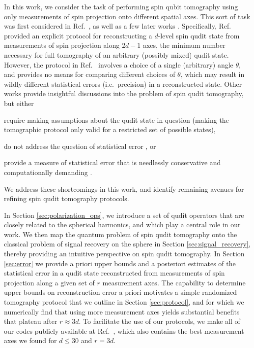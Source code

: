 \documentclass[nofootinbib,twocolumn]{revtex4-1}
\begin{document}
In this work, we consider the task of performing spin qubit tomography using only measurements of spin projection onto different spatial axes.
This sort of task was first considered in Ref.~\cite{newton1968measurability}, as well as a few later works \cite{hofmann2004quantumstate, filippov2010inverse, schmied2011tomographic}.
Specifically, Ref.~\cite{newton1968measurability} provided an explicit protocol for reconstructing a $d$-level spin qudit state from measurements of spin projection along $2d-1$ axes, the minimum number necessary for full tomography of an arbitrary (possibly mixed) qudit state.
However, the protocol in Ref.~\cite{newton1968measurability} involves a choice of a single (arbitrary) angle $\theta$, and provides no means for comparing different choices of $\theta$, which may result in wildly different statistical errors (i.e.~precision) in a reconstructed state.
Other works provide insightful discussions into the problem of spin qudit tomography, but either
\begin{enumerate*}
\item require making assumptions about the qudit state in question \cite{schmied2011tomographic} (making the tomographic protocol only valid for a restricted set of possible states),
\item do not address the question of statistical error \cite{hofmann2004quantumstate}, or
\item provide a measure of statistical error that is needlessly conservative and computationally demanding \cite{filippov2010inverse}.
\end{enumerate*}
We address these shortcomings in this work, and identify remaining avenues for refining spin qudit tomography protocols.

In Section \ref{sec:polarization_ops}, we introduce a set of qudit operators that are closely related to the spherical harmonics, and which play a central role in our work.
We then map the quantum problem of spin qudit tomography onto the classical problem of signal recovery on the sphere in Section \ref{sec:signal_recovery}, thereby providing an intuitive perspective on spin qudit tomography.
In Section \ref{sec:error} we provide a priori upper bounds and a posteriori estimates of the statistical error in a qudit state reconstructed from measurements of spin projection along a given set of $r$ measurement axes.
The capability to determine upper bounds on reconstruction error a priori motivates a simple randomized tomography protocol that we outline in Section \ref{sec:protocol}, and for which we numerically find that using more measurement axes yields substantial benefits that plateau after $r\approx3d$.
To facilitate the use of our protocols, we make all of our codes publicly available at Ref.~\cite{tomo_codes}, which also contains the best measurement axes we found for $d\le30$ and $r=3d$.
\end{document}
